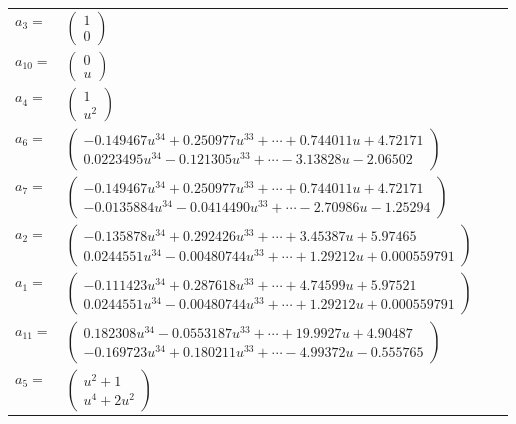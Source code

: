 \documentclass[1p]{elsarticle_modified}
\theoremstyle{definition}
\begin{document}
\begin{tabular}{m{7pt} m{180pt} m{7pt} m{180pt} }
\flushright $a_{3}=$&$\begin{pmatrix}1\\0\end{pmatrix}$ \\
\flushright $a_{10}=$&$\begin{pmatrix}0\\u\end{pmatrix}$ \\
\flushright $a_{4}=$&$\begin{pmatrix}1\\u^2\end{pmatrix}$ \\
\flushright $a_{6}=$&$\begin{pmatrix}-0.149467 u^{34}+0.250977 u^{33}+\cdots+0.744011 u+4.72171\\0.0223495 u^{34}-0.121305 u^{33}+\cdots-3.13828 u-2.06502\end{pmatrix}$ \\
\flushright $a_{7}=$&$\begin{pmatrix}-0.149467 u^{34}+0.250977 u^{33}+\cdots+0.744011 u+4.72171\\-0.0135884 u^{34}-0.0414490 u^{33}+\cdots-2.70986 u-1.25294\end{pmatrix}$ \\
\flushright $a_{2}=$&$\begin{pmatrix}-0.135878 u^{34}+0.292426 u^{33}+\cdots+3.45387 u+5.97465\\0.0244551 u^{34}-0.00480744 u^{33}+\cdots+1.29212 u+0.000559791\end{pmatrix}$ \\
\flushright $a_{1}=$&$\begin{pmatrix}-0.111423 u^{34}+0.287618 u^{33}+\cdots+4.74599 u+5.97521\\0.0244551 u^{34}-0.00480744 u^{33}+\cdots+1.29212 u+0.000559791\end{pmatrix}$ \\
\flushright $a_{11}=$&$\begin{pmatrix}0.182308 u^{34}-0.0553187 u^{33}+\cdots+19.9927 u+4.90487\\-0.169723 u^{34}+0.180211 u^{33}+\cdots-4.99372 u-0.555765\end{pmatrix}$ \\
\flushright $a_{5}=$&$\begin{pmatrix}u^2+1\\u^4+2 u^2\end{pmatrix}$ \\

\end{tabular}
\end{document}
